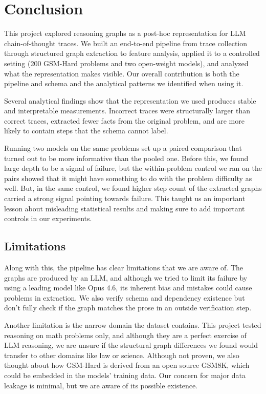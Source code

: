 \documentclass[letterpaper]{article}
\begin{document}
\section{Conclusion}

This project explored reasoning graphs as a post-hoc representation
for LLM chain-of-thought traces. We built an end-to-end pipeline from
trace collection through structured graph extraction to feature
analysis, applied it to a controlled setting (200 GSM-Hard problems and
two open-weight models), and analyzed what the representation makes visible. Our overall contribution is both the pipeline and schema and the analytical patterns we identified when using it.

Several analytical findings show that the representation we used produces stable and interpretable measurements. Incorrect traces were structurally larger than correct traces, extracted fewer facts from the original problem, and are more likely to contain steps that the schema cannot label. 

Running two models on the same problems set up a paired comparison that turned out to be more informative than the pooled one. Before this, we found large depth to be a signal of failure, but the within-problem control we ran on the pairs showed that it might have something to do with the problem difficulty as well. But, in the same control, we found higher step count of the extracted graphs carried a strong signal pointing towards failure. This taught us an important lesson about misleading statistical results and making sure to add important controls in our experiments.

\subsection{Limitations}

Along with this, the pipeline has clear limitations that we are aware of. The graphs are produced by an LLM, and although we tried to limit its failure by using a leading model like Opus 4.6, its inherent bias and mistakes could cause problems in extraction. We also verify schema and dependency existence but don't fully check if the graph matches the prose in an outside verification step.

Another limitation is the narrow domain the dataset contains. This project tested reasoning on math problems only, and although they are a perfect exercise of LLM reasoning, we are unsure if the structural graph differences we found would transfer to other domains like law or science. Although not proven, we also thought about how GSM-Hard is derived from an open source GSM8K, which could be embedded in the models' training data. Our concern for major data leakage is minimal, but we are aware of its possible existence.
\end{document}
